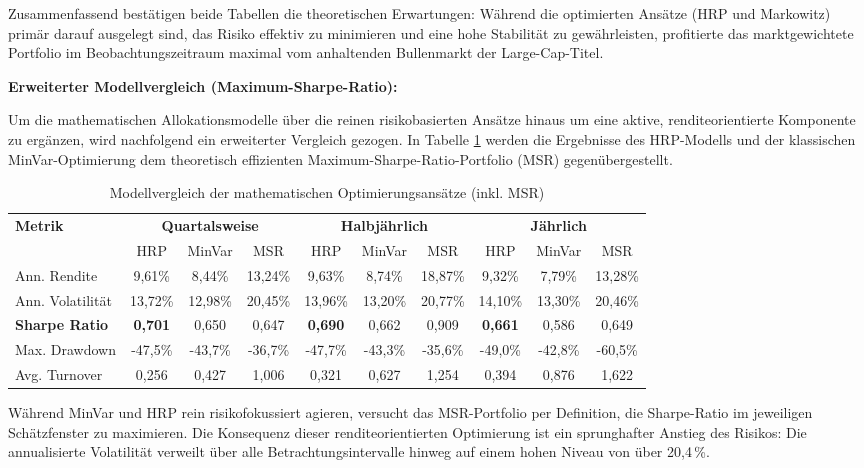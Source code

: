 \documentclass[parskip=half]{scrartcl}
\begin{document}
	Zusammenfassend bestätigen beide Tabellen die theoretischen Erwartungen: Während die optimierten Ansätze (HRP und Markowitz) primär darauf ausgelegt sind, das Risiko effektiv zu minimieren und eine hohe Stabilität zu gewährleisten, profitierte das marktgewichtete Portfolio im Beobachtungszeitraum maximal vom anhaltenden Bullenmarkt der Large-Cap-Titel.
	
	\clearpage
	
	\textbf{Erweiterter Modellvergleich (Maximum-Sharpe-Ratio):}
	
	Um die mathematischen Allokationsmodelle über die reinen risikobasierten Ansätze hinaus um eine aktive, renditeorientierte Komponente zu ergänzen, wird nachfolgend ein erweiterter Vergleich gezogen. In Tabelle \ref{tab:performance_msr_vergleich} werden die Ergebnisse des HRP-Modells und der klassischen MinVar-Optimierung dem theoretisch effizienten Maximum-Sharpe-Ratio-Portfolio (MSR) gegenübergestellt.
	
	\begin{table}[H]
		\centering
		\caption{Modellvergleich der mathematischen Optimierungsansätze (inkl. MSR)}
		\label{tab:performance_msr_vergleich}
		\small
		\begin{tabular}{@{}lccccccccc@{}}
			\toprule
			\textbf{Metrik} & \multicolumn{3}{c}{\textbf{Quartalsweise}} & \multicolumn{3}{c}{\textbf{Halbjährlich}} & \multicolumn{3}{c}{\textbf{Jährlich}} \\ \cmidrule(lr){2-4} \cmidrule(lr){5-7} \cmidrule(lr){8-10}
			& HRP & MinVar & MSR & HRP & MinVar & MSR & HRP & MinVar & MSR \\ \midrule
			Ann. Rendite     & 9,61\% & 8,44\% & 13,24\% & 9,63\% & 8,74\% & 18,87\% & 9,32\% & 7,79\% & 13,28\% \\
			Ann. Volatilität & 13,72\% & 12,98\% & 20,45\% & 13,96\% & 13,20\% & 20,77\% & 14,10\% & 13,30\% & 20,46\% \\
			\textbf{Sharpe Ratio} & \textbf{0,701} & 0,650 & 0,647 & \textbf{0,690} & 0,662 & 0,909 & \textbf{0,661} & 0,586 & 0,649 \\
			Max. Drawdown    & -47,5\% & -43,7\% & -36,7\% & -47,7\% & -43,3\% & -35,6\% & -49,0\% & -42,8\% & -60,5\% \\
			Avg. Turnover    & 0,256  & 0,427  & 1,006  & 0,321  & 0,627  & 1,254  & 0,394  & 0,876  & 1,622  \\ \bottomrule
		\end{tabular}
	\end{table}
	
	
	Während MinVar und HRP rein risikofokussiert agieren, versucht das MSR-Portfolio per Definition, die Sharpe-Ratio im jeweiligen Schätzfenster zu maximieren. Die Konsequenz dieser renditeorientierten Optimierung ist ein sprunghafter Anstieg des Risikos: Die annualisierte Volatilität verweilt über alle Betrachtungsintervalle hinweg auf einem hohen Niveau von über 20,4\,\%.
	
\end{document}
